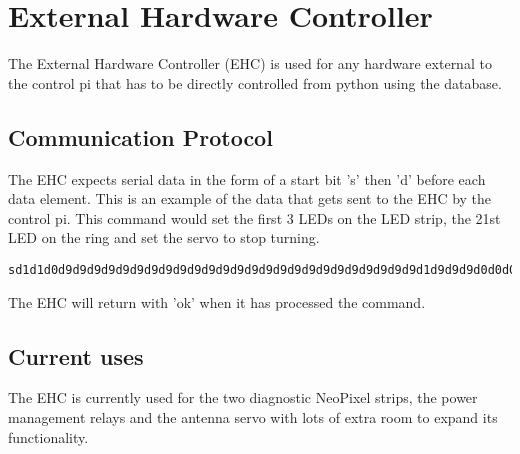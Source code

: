 \section{External Hardware Controller}
The External Hardware Controller (EHC) is used for any hardware external to the control pi that has to be directly controlled from python using the database.

\subsection{Communication Protocol}
The EHC expects serial data in the form of a start bit 's' then 'd' before each data element. This is an example of the data that gets sent to the EHC by the control pi. This command would set the first 3 LEDs on the LED strip, the 21st LED on the ring and set the servo to stop turning.
\begin{lstlisting}
sd1d1d0d9d9d9d9d9d9d9d9d9d9d9d9d9d9d9d9d9d9d9d9d9d9d9d9d9d1d9d9d9d0d0d0d0d75 
\end{lstlisting}

The EHC will return with 'ok' when it has processed the command.

\subsection{Current uses}
The EHC is currently used for the two diagnostic NeoPixel strips, the power management relays and the antenna servo with lots of extra room to expand its functionality.


